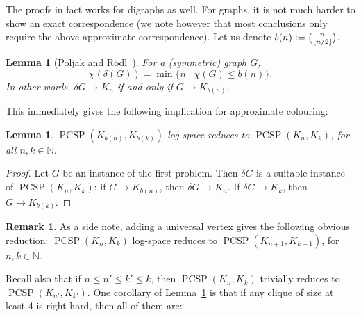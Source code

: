 \documentclass[11pt,a4paper]{scrartcl}
\numberwithin{theorem}{section}
\newtheorem{lemma}[theorem]{Lemma}
\theoremstyle{definition}
\newtheorem{remark}[theorem]{Remark}
\newcommand{\NN}{\mathbb{N}}
\newcommand{\defeq}{\vcentcolon=}
\DeclareMathOperator{\PCSP}{PCSP}
\newcommand\B[1]{{\textstyle\binom{#1}{\lfloor #1/2 \rfloor}}}
\begin{document}
The proofs in fact works for digraphs as well.
For graphs, it is not much harder to show an exact correspondence
(we note however that most conclusions only require the above approximate correspondence).
Let us denote $b(n)\defeq \B{n}$.

\begin{lemma}[Poljak and R\"odl~\cite{PoljakR81}]\label{lem:PoljakRodl}
	For a (symmetric) graph $G$, 
  \[\chi(\delta(G)) = \min\{n \mid \chi(G) \leq b(n)\}.\]
	In other words, $\delta G \to K_n$ if and only if $G \to K_{b(n)}$.
\end{lemma}

This immediately gives the following implication for approximate colouring:

\begin{lemma}\label{lem:red}
	$\PCSP(K_{b(n)},K_{b(k)})$ log-space reduces to $\PCSP(K_n,K_k)$, for all $n,k \in \NN$.
\end{lemma}
\begin{proof}
	Let $G$ be an instance of the first problem.
	Then $\delta G$ is a suitable instance of $\PCSP(K_n,K_k)$:
	if $G \to K_{b(n)}$, then $\delta G \to K_n$.
	If $\delta G \to K_k$, then $G \to K_{b(k)}$.
\end{proof}

\begin{remark}
	As a side note, adding a universal vertex gives the following obvious reduction:
	$\PCSP(K_n,K_k)$ log-space reduces to $\PCSP(K_{n+1},K_{k+1})$,
	for $n,k \in \NN$.
\end{remark}


Recall also that if $n \leq n' \leq k' \leq k$, then $\PCSP(K_n,K_k)$ trivially reduces to $\PCSP(K_{n'},K_{k'})$.
One corollary of Lemma~\ref{lem:red} is that if any clique of size at least 4 is right-hard, then all of them are:
\end{document}
